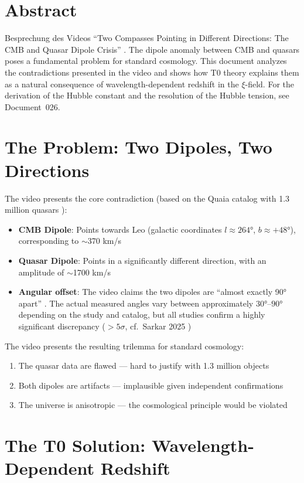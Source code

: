 \section*{Abstract}
	Besprechung des Videos ``Two Compasses Pointing in Different Directions: The CMB and Quasar Dipole Crisis'' \cite{video}. The dipole anomaly between CMB and quasars poses a fundamental problem for standard cosmology. This document analyzes the contradictions presented in the video and shows how T0 theory explains them as a natural consequence of wavelength-dependent redshift in the $\xi$-field. For the derivation of the Hubble constant and the resolution of the Hubble tension, see Document~026.

\section{The Problem: Two Dipoles, Two Directions}

	The video presents the core contradiction (based on the Quaia catalog with 1.3 million quasars \cite{storey2024}):
	\begin{itemize}
		\item \textbf{CMB Dipole}: Points towards Leo (galactic coordinates $l \approx 264°$, $b \approx +48°$), corresponding to $\sim$370 km/s
		\item \textbf{Quasar Dipole}: Points in a significantly different direction, with an amplitude of $\sim$1700 km/s \cite{mittal2024}
		\item \textbf{Angular offset}: The video claims the two dipoles are ``almost exactly 90° apart'' \cite{secrest2024}. The actual measured angles vary between approximately $30°$--$90°$ depending on the study and catalog, but all studies confirm a highly significant discrepancy ($> 5\sigma$, cf.\ Sarkar 2025 \cite{sarkar2025})
	\end{itemize}

	The video presents the resulting trilemma for standard cosmology:
	\begin{enumerate}
		\item The quasar data are flawed --- hard to justify with 1.3 million objects
		\item Both dipoles are artifacts --- implausible given independent confirmations
		\item The universe is anisotropic --- the cosmological principle would be violated
	\end{enumerate}

\section{The T0 Solution: Wavelength-Dependent Redshift}

